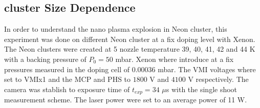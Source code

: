 %

\subsection{cluster Size Dependence}

In order to understand the nano plasma explosion in Neon cluster, this experiment was done on different Neon cluster at a fix doping level with Xenon. The Neon clusters were created at 5 nozzle temperature 39, 40, 41, 42 and 44 K with a backing pressure of $P_{0}=50$ mbar. Xenon where introduce at a fix  pressures measured in the doping cell of 0.00036 mbar. The VMI voltages  where set to VMIx1  and the MCP and PHS to $1800$ V and $4100$ V respectively. The camera was stablish to exposure time of $t_{exp}=34$ $\mu$s   with the single shoot measurement scheme. The laser power were set to an average power of 11 W.

